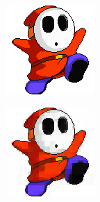 \documentclass[11pt]{report}
\theoremstyle{plain}
\theoremstyle{remark}
\begin{document}
\begin{figure}
	\centering
	\begin{subfigure}[b]{0.24\textwidth}
		\centering
		\includegraphics[width=\textwidth]{plaatjes/shyguy_haar_0_1.png}
	\end{subfigure}
	\begin{subfigure}[b]{0.24\textwidth}
		\centering
		\includegraphics[width=\textwidth]{plaatjes/shyguy_haar_0_05.png}

\end{subfigure}
\end{figure}
\end{document}
